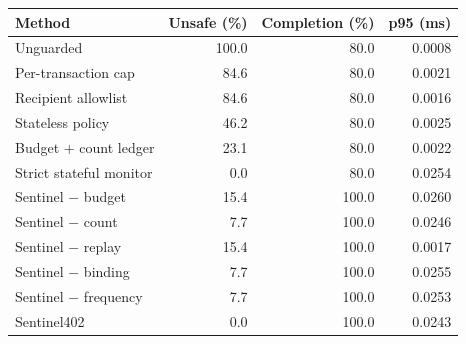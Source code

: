 \begin{tabular}{lrrr}
\hline
Method & Unsafe (\%) & Completion (\%) & p95 (ms) \\
\hline
Unguarded & 100.0 & 80.0 & 0.0008 \\
Per-transaction cap & 84.6 & 80.0 & 0.0021 \\
Recipient allowlist & 84.6 & 80.0 & 0.0016 \\
Stateless policy & 46.2 & 80.0 & 0.0025 \\
Budget + count ledger & 23.1 & 80.0 & 0.0022 \\
Strict stateful monitor & 0.0 & 80.0 & 0.0254 \\
Sentinel $-$ budget & 15.4 & 100.0 & 0.0260 \\
Sentinel $-$ count & 7.7 & 100.0 & 0.0246 \\
Sentinel $-$ replay & 15.4 & 100.0 & 0.0017 \\
Sentinel $-$ binding & 7.7 & 100.0 & 0.0255 \\
Sentinel $-$ frequency & 7.7 & 100.0 & 0.0253 \\
Sentinel402 & 0.0 & 100.0 & 0.0243 \\
\hline
\end{tabular}
